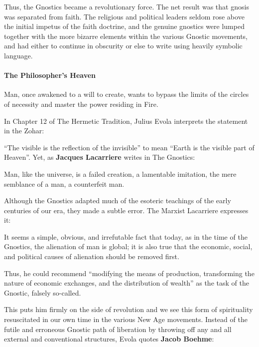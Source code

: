 Thus, the Gnostics became a revolutionary force. The net result was that gnosis was separated from faith. The religious and political leaders seldom rose above the initial impetus of the faith doctrine, and the genuine gnostics were lumped together with the more bizarre elements within the various Gnostic movements, and had either to continue in obscurity or else to write using heavily symbolic language.

\paragraph{The Philosopher’s Heaven}

\begin{quotex}
Man, once awakened to a will to create, wants to bypass the limits of the circles of necessity and master the power residing in Fire.
\end{quotex}


In Chapter 12 of The Hermetic Tradition, Julius Evola interprets the statement in the Zohar:

``The visible is the reflection of the invisible'' to mean ``Earth is the visible part of Heaven''. Yet, as \textbf{Jacques Lacarriere} writes in The Gnostics:

\begin{quotex}
Man, like the universe, is a failed creation, a lamentable imitation, the mere semblance of a man, a counterfeit man.
\end{quotex}


Although the Gnostics adapted much of the esoteric teachings of the early centuries of our era, they made a subtle error. The Marxist Lacarriere expresses it:

\begin{quotex}
It seems a simple, obvious, and irrefutable fact that today, as in the time of the Gnostics, the alienation of man is global; it is also true that the economic, social, and political causes of alienation should be removed first.
\end{quotex}


Thus, he could recommend ``modifying the means of production, transforming the nature of economic exchanges, and the distribution of wealth'' as the task of the Gnostic, falsely so-called.

This puts him firmly on the side of revolution and we see this form of spirituality resuscitated in our own time in the various New Age movements. Instead of the futile and erroneous Gnostic path of liberation by throwing off any and all external and conventional structures, Evola quotes \textbf{Jacob Boehme}:


